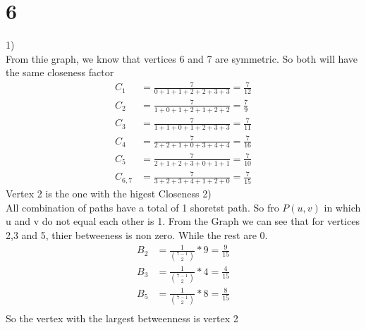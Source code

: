 \documentclass[12pt,english]{article}
\begin{document}
\section*{6}
1)\\
From thie graph, we know that vertices 6 and 7 are symmetric. So both will have the same closeness factor
\begin{align*}
C_1 &= \frac{7}{0 + 1 + 1 +2 +2 +3 +3}=\frac{7}{12}\\
C_2 &= \frac{7}{1 + 0 + 1 +2 +1 +2 +2}=\frac{7}{9}\\
C_3 &= \frac{7}{1 + 1 + 0 +1 +2 +3 +3}=\frac{7}{11}\\
C_4 &= \frac{7}{2 + 2 + 1 +0 +3 +4 +4}=\frac{7}{16}\\
C_5 &= \frac{7}{2 + 1 + 2 +3 +0 +1 +1}=\frac{7}{10}\\
C_{6,7} &= \frac{7}{3 + 2 + 3 +4 +1+2 +0}=\frac{7}{15}
\end{align*}
Vertex 2 is the one with the higest Closeness
2)\\
All combination of paths have a total of 1 shoretst path. So fro $P(u,v)$ in which u and v do not equal each other is 1. From the Graph we can see that for vertices 2,3 and 5, thier betweeness is non zero. While the rest are 0.
\begin{align*}
B_2 &= \frac{1}{{7-1\choose 2}}*9=\frac{9}{15}\\
B_3 &= \frac{1}{{7-1\choose 2}}*4=\frac{4}{15}\\
B_5 &= \frac{1}{{7-1\choose 2}}*8=\frac{8}{15}\\
\end{align*}
So the vertex with the largest betweenness is vertex 2
\end{document}
